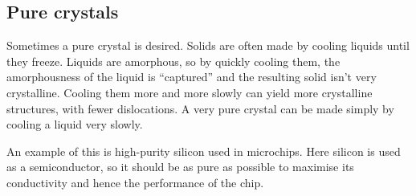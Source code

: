 \documentclass{article}
\begin{document}
    \subsection{Pure crystals}
    Sometimes a pure crystal is desired. Solids are often made by cooling
    liquids until they freeze. Liquids are amorphous, so by quickly cooling
    them, the amorphousness of the liquid is ``captured'' and the resulting
    solid isn't very crystalline. Cooling them more and more slowly can yield
    more crystalline structures, with fewer dislocations. A very pure crystal
    can be made simply by cooling a liquid very slowly.

    An example of this is high-purity silicon used in microchips. Here silicon
    is used as a semiconductor, so it should be as pure as possible to maximise
    its conductivity and hence the performance of the chip.
{}

\end{document}
